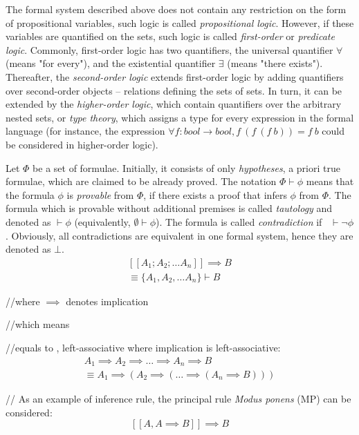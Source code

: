 \documentclass[article]{aaltoseries}
\begin{document}
The formal system described above does not contain any restriction on the form of propositional variables, such logic is called \textit{propositional logic}. However, if these variables are quantified on the sets, such logic is called \textit{first-order} or \textit{predicate logic}. Commonly, first-order logic has two quantifiers, the universal quantifier $\forall$ (means "for every"), and the existential quantifier $\exists$ (means "there exists"). Thereafter, the \textit{second-order logic} extends first-order logic by adding quantifiers over second-order objects -- relations defining the sets of sets. In turn, it can be extended by the \textit{higher-order logic}, which contain quantifiers over the arbitrary nested sets, or \textit{type theory}, which assigns a type for every expression in the formal language (for instance, the expression $\forall f: bool \rightarrow bool, f\ (f\ (f\ b)) = f\ b$ could be considered in higher-order logic).

Let $\Phi$ be a set of formulae. Initially, it consists of only \textit{hypotheses}, a priori true formulae, which are claimed to be already proved. The notation $\Phi \vdash \phi$ means that the formula $\phi$ is \textit{provable} from $\Phi$, if there exists a proof that infers $\phi$ from $\Phi$. The formula which is provable without additional premises is called \textit{tautology} and denoted as $ \vdash \phi $ (equivalently, $\emptyset \vdash \phi$). The formula is called \textit{contradiction} if \ $\vdash \neg \phi$. Obviously, all contradictions are equivalent in one formal system, hence they are denoted as $\bot$.
\begin{gather}\label{notation_infrule}
[\![ A_{1}; A_{2}; \dots A_{n} ]\!] \implies B \\
\equiv \{ A_{1}, A_{2}, \dots A_{n} \} \vdash B
\end{gather}

//where $\implies$ denotes implication

//which means $ $

//equals to , left-associative where implication is left-associative:
\begin{gather}
A_{1} \implies A_{2} \implies \dots \implies A_{n} \implies B \\
\equiv A_{1} \implies ( A_{2} \implies ( \dots \implies ( A_{n} \implies B)))
\end{gather}

// As an example of inference rule, the principal rule \textit{Modus ponens} (MP) can be considered: 
\begin{equation}\label{rule_modus_ponens}\tag{MP}
[\![ A, A \implies B ]\!] \implies B
\end{equation}
\end{document}
